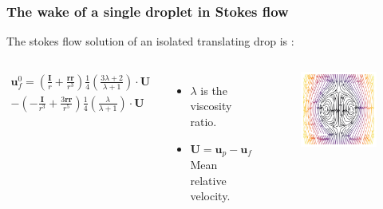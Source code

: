 \documentclass{sintefbeamer}
\begin{document}
\begin{frame}
  \frametitle{The wake of a single droplet in Stokes flow}

 

  The stokes flow solution of an isolated translating drop is :
  \begin{columns}
  \begin{multline*}
    \textbf{u}_f^0
    = \left(\frac{ \textbf{I}}{r} + \frac{\textbf{rr}}{r^3}\right)  \frac{1}{4}\left(\frac{3\lambda + 2}{\lambda +1}\right)  \cdot \textbf{U}\\
    - \left(-\frac{\textbf{I}}{r^3} + \frac{3 \textbf{rr} }{r^5}\right)  \frac{1}{4}\left(\frac{\lambda}{\lambda +1}\right)  \cdot \textbf{U}
  \end{multline*}
  \begin{itemize}
      \item $\lambda$ is the viscosity ratio.
      \item  $\textbf{U} = \textbf{u}_p - \textbf{u}_f$ Mean relative velocity. 
  \end{itemize}
  \begin{figure}
    \includegraphics[width=\textwidth]{image/Rising_Stokes.png}
  \end{figure}
  \end{columns}
  


\end{frame}
\end{document}
